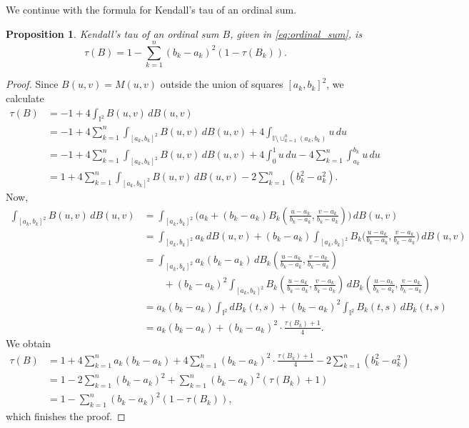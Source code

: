 \documentclass[12pt,a4paper]{amsart}
\newtheorem{proposition}[theorem]{Proposition}
\theoremstyle{definition}
\newcommand{\II}{\mathbb{I}}
\begin{document}
We continue with the formula for Kendall's tau of an ordinal sum. 

\begin{proposition}\label{prop:ordinal-tau}
   Kendall's tau of an ordinal sum $B$, given in \eqref{eq:ordinal_sum}, is
    \begin{equation} \label{eq:ordinal-tau}
        \tau(B) =  1 - \sum_{k=1}^n (b_k-a_k)^2(1-\tau(B_k)). 
    \end{equation}  
\end{proposition}

\begin{proof}
Since $B(u,v) = M(u,v)$ outside the union of squares $[a_k, b_k]^2$, we calculate
\begin{align*}
\tau(B) &= - 1 + 4\int_{\II^2} B(u, v) \, dB(u,v) \\
&= -1 + 4 \sum_{k=1}^n  \int_{[a_k, b_k]^2} B(u, v) \, dB(u,v)  + 4 \int_{\II\setminus\cup_{k=1}^n(a_k,b_k)} u \, du\\
&= -1 + 4 \sum_{k=1}^n  \int_{[a_k, b_k]^2} B(u, v) \, dB(u,v) + 4 \int_0^1 u \, du - 4 \sum_{k=1}^n \int_{a_k}^{b_k} u \, du \\
&= 1 + 4 \sum_{k=1}^n  \int_{[a_k, b_k]^2} B(u, v) \, dB(u,v) - 2 \sum_{k=1}^n (b_k^2-a_k^2).
\end{align*}
Now,
\begin{align*}
\int_{[a_k, b_k]^2} B(u, v) \, dB(u,v) &= \int_{[a_k, b_k]^2} \big(a_k + (b_k-a_k)B_k(\tfrac{u-a_k}{b_k-a_k},\tfrac{v-a_k}{b_k-a_k})\big) \, dB(u,v) \\ 
&= \int_{[a_k, b_k]^2} a_k \, dB(u,v) + (b_k-a_k)\int_{[a_k, b_k]^2}B_k\big(\tfrac{u-a_k}{b_k-a_k},\tfrac{v-a_k}{b_k-a_k}\big) \, dB(u,v) \\ 
&= \int_{[a_k, b_k]^2} a_k(b_k-a_k) \, dB_k(\tfrac{u-a_k}{b_k-a_k},\tfrac{v-a_k}{b_k-a_k}) \\
&\qquad + (b_k-a_k)^2\int_{[a_k, b_k]^2}B_k(\tfrac{u-a_k}{b_k-a_k},\tfrac{v-a_k}{b_k-a_k}) \, dB_k(\tfrac{u-a_k}{b_k-a_k},\tfrac{v-a_k}{b_k-a_k}) \\ 
&= a_k(b_k-a_k) \int_{\II^2} dB_k(t,s) + (b_k-a_k)^2\int_{\II^2}B_k(t,s) \, dB_k(t,s) \\ 
&= a_k(b_k-a_k) + (b_k-a_k)^2 \cdot \frac{\tau(B_k)+1}{4}.
\end{align*}
We obtain
\begin{align*}
\tau(B) &= 1 + 4 \sum_{k=1}^n  a_k(b_k-a_k) + 4 \sum_{k=1}^n  (b_k-a_k)^2\cdot\frac{\tau(B_k)+1}{4} - 2 \sum_{k=1}^n (b_k^2-a_k^2) \\  
&= 1 -2 \sum_{k=1}^n  (b_k-a_k)^2 + \sum_{k=1}^n  (b_k-a_k)^2(\tau(B_k)+1)  \\    
&= 1 - \sum_{k=1}^n  (b_k-a_k)^2(1-\tau(B_k)),   
\end{align*}
which finishes the proof.
\end{proof}
\end{document}
